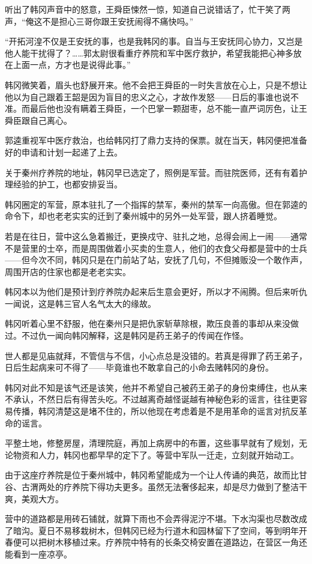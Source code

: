 听出了韩冈声音中的怒意，王舜臣悚然一惊，知道自己说错话了，忙干笑了两声，“俺这不是担心三哥你跟王安抚闹得不痛快吗。”

“开拓河湟不仅是王安抚的事，也是我韩冈的事。自当与王安抚同心协力，又岂是他人能干扰得了？……郭太尉很看重疗养院和军中医疗救护，希望我能把心神多放在上面一点，方才也是说得此事。”

韩冈微笑着，眉头也舒展开来。他不会把王舜臣的一时失言放在心上，只是不想让他以为自己跟着王韶是因为盲目的忠义之心，才故作发怒——日后的事谁也说不准。而最后他也没有瞒着王舜臣，一个巴掌一颗甜枣，总不能一直严词厉色，让王舜臣跟自己离心。

郭逵重视军中医疗救治，也给韩冈打了鼎力支持的保票。就在当天，韩冈便把准备好的申请和计划一起递了上去。

关于秦州疗养院的地址，韩冈早已选定了，照例是军营。而驻院医师，还有有着护理经验的护工，也都安排妥当。

韩冈圈定的军营，原本驻扎了一个指挥的禁军，秦州的禁军一向高傲。但在郭逵的命令下，却也老老实实的迁到了秦州城中的另外一处军营，跟人挤着睡觉。

若是在往日，营中这么急着搬迁，更换戍守、驻扎之地，总得会闹上一闹——通常不是营里的士卒，而是周围做着小买卖的生意人，他们的衣食父母都是营中的士兵——但今次不同，韩冈只是在门前站了站，安抚了几句，不但摊贩没一个敢作声，周围开店的住家也都是老老实实。

韩冈本以为他们是预计到疗养院办起来后生意会更好，所以才不闹腾。但后来听仇一闻说，这是韩三官人名气太大的缘故。

韩冈听着心里不舒服，他在秦州只是把仇家斩草除根，欺压良善的事却从来没做过。不过仇一闻向韩冈解释，这是韩冈是药王弟子的传闻在作怪。

世人都是见庙就拜，不管信与不信，小心点总是没错的。若真是得罪了药王弟子，日后生起病来可不得了——毕竟谁也不敢拿自己的小命去赌韩冈的身份。

韩冈对此不知是该气还是该笑，他并不希望自己被药王弟子的身份束缚住，也从来不承认，不然日后有得苦头吃。不过越离奇越怪诞越有神秘色彩的谣言，往往更容易传播，韩冈清楚这是堵不住的，所以他现在考虑着是不是用革命的谣言对抗反革命的谣言。

平整土地，修整房屋，清理院庭，再加上病房中的布置，这些事早就有了规划，无论物资和人力，韩冈也都早早的定下了。等营中军队一迁走，立刻就开始动工。

由于这座疗养院是位于秦州城中，韩冈希望能成为一个让人传诵的典范，故而比甘谷、古渭两处的疗养院下得功夫更多。虽然无法奢侈起来，却是尽力做到了整洁干爽，美观大方。

营中的道路都是用砖石铺就，就算下雨也不会弄得泥泞不堪。下水沟渠也尽数改成了暗沟。夏日不易移栽树木，但韩冈已经为行道木和园林留下了空间，等到明年开春便可以把树木移植过来。疗养院中特有的长条交椅安置在道路边，在营区一角还能看到一座凉亭。

